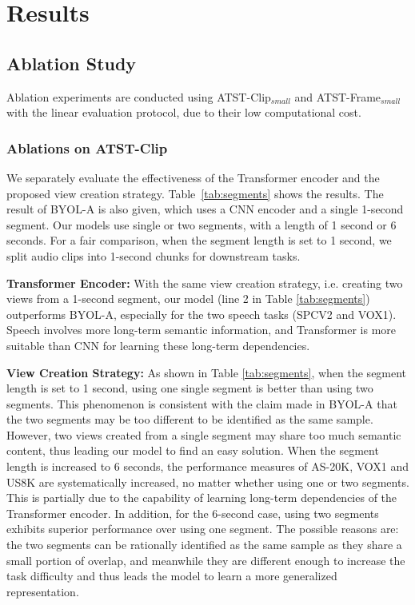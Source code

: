 
\section{Results}
\subsection{Ablation Study}
Ablation experiments are conducted using ATST-Clip$_{small}$  and ATST-Frame$_{small}$ with the linear evaluation protocol, due to their low computational cost.

\subsubsection{Ablations on ATST-Clip}
\label{sec:ablation}


We separately evaluate the effectiveness of the Transformer encoder and the proposed view creation strategy. Table~\ref{tab:segments} shows the results. The result of BYOL-A is also given, which uses a CNN encoder and a single 1-second segment. Our models use single or two segments, with a length of 1 second or 6 seconds. For a fair comparison, when the segment length is set to 1 second, we split audio clips into 1-second chunks for downstream tasks.

\textbf{Transformer Encoder:} With the same view creation strategy, i.e. creating two views from a 1-second segment, our model (line 2 in Table \ref{tab:segments}) outperforms BYOL-A, especially for the two speech tasks (SPCV2 and VOX1). Speech involves more long-term semantic information, and Transformer is more suitable than CNN for learning these long-term dependencies. 

\textbf{View Creation Strategy:} As shown in Table \ref{tab:segments}, when the segment length is set to 1 second, using one single segment is better than using two segments. This phenomenon is consistent with the claim made in BYOL-A \cite{niizumi_byol_2021} that the two segments may be too different to be identified as the same sample. However, two views created from a single segment may share too much semantic content, thus leading our model to find an easy solution.
When the segment length is increased to 6 seconds, the performance measures of AS-20K, VOX1 and US8K are systematically increased, no matter whether using one or two segments. This is partially due to the capability of learning long-term dependencies of the Transformer encoder.
In addition, for the 6-second case, using two segments exhibits superior performance over using one segment. The possible reasons are: the two segments can be rationally identified as the same sample as they share a small portion of overlap, and meanwhile they are different enough to increase the task difficulty and thus leads the model to learn a more generalized representation.

